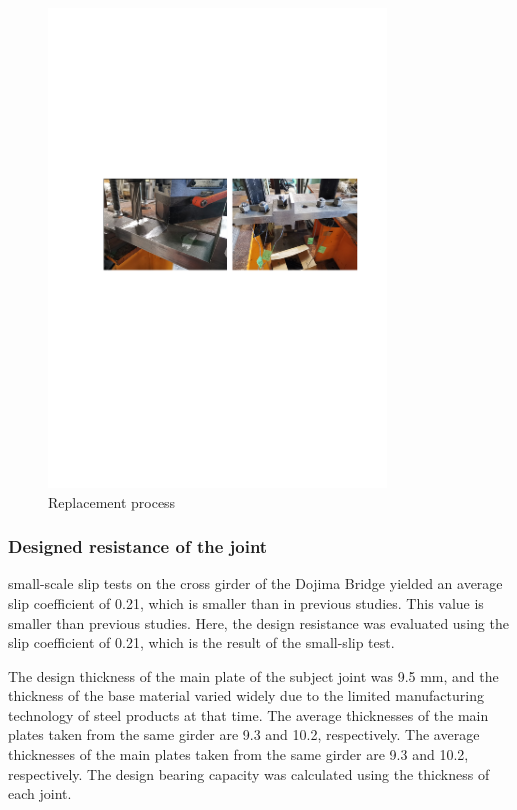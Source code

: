 \begin{figure}[htbp]
    \centering
    \includegraphics[width=0.8\textwidth]{imgs/ch3/reproce.pdf}
    \caption{Replacement process}
    \label{fig-reproce}
\end{figure}

\subsubsection{Designed resistance of the joint}

small-scale slip tests on the cross girder of the Dojima Bridge yielded an average slip coefficient of 0.21, which is smaller than in previous studies. This value is smaller than previous studies. Here, the design resistance was evaluated using the slip coefficient of 0.21, which is the result of the small-slip test.

The design thickness of the main plate of the subject joint was 9.5 mm, and the thickness of the base material varied widely due to the limited manufacturing technology of steel products at that time. The average thicknesses of the main plates taken from the same girder are 9.3 and 10.2, respectively.
The average thicknesses of the main plates taken from the same girder are 9.3 and 10.2, respectively. The design bearing capacity was calculated using the thickness of each joint.

